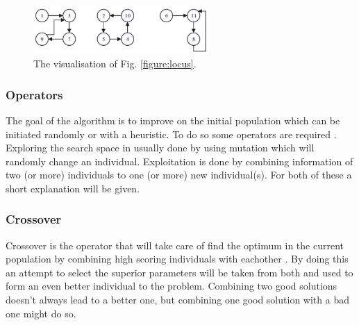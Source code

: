 \begin{figure}
\begin{center}
\includegraphics[width=0.6\textwidth]{images/encode.png}
\caption{The visualisation of Fig. \ref{figure:locus}.}\label{figure:encode}
\end{center}
\end{figure}

\subsubsection{Operators}
The goal of the algorithm is to improve on the initial population which can be initiated randomly or with a heuristic.
To do so some operators are required \cite{genetics}.
Exploring the search space in usually done by using mutation which will randomly change an individual.
Exploitation is done by combining information of two (or more) individuals to one (or more) new individual(s).
For both of these a short explanation will be given.
\newpage
\subsubsection*{Crossover}
Crossover is the operator that will take care of find the optimum in the current population by combining high scoring individuals with eachother \cite{genetics}.
By doing this an attempt to select the superior parameters will be taken from both and used to form an even better individual to the problem.
Combining two good solutions doesn't always lead to a better one, but combining one good solution with a bad one might do so.

